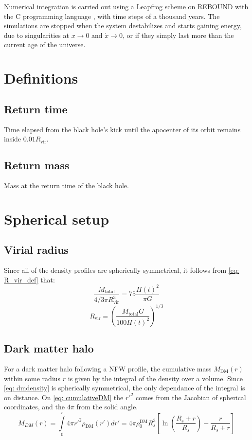 		Numerical integration is carried out using a Leapfrog scheme on REBOUND with the C programming language \cite{larson2017modeling}, with time steps of a thousand years. The simulations are stopped when the system destabilizes and starts gaining energy, due to singularities at $x \rightarrow 0$ and $\dot{x} \rightarrow 0$, or if they simply last more than the current age of the universe. 
		
	\section{Definitions}
		\subsection{Return time}
			Time elapsed from the black hole's kick until the apocenter of its orbit remains inside $0.01R_\text{vir}$.
		\subsection{Return mass}
			Mass at the return time of the black hole.
			
	\section{Spherical setup}
	\subsection{Virial radius}
		Since all of the density profiles are spherically symmetrical, it follows from \autoref{eq: R_vir_def} that:  
		\begin{equation}
		\dfrac{M_\text{total}}{4/3\pi R_\text{vir}^3} = 75\dfrac{H(t)^2}{\pi G}
		\end{equation}
		\begin{equation}\label{eq: r_vir}
		R_\text{vir} = \left({\dfrac{M_\text{total}G}{100 H(t)^2}}\right)^{1/3}
		\end{equation}
	
	\subsection{Dark matter halo}
		For a dark matter halo following a NFW profile, the cumulative mass $M_\text{DM}(r)$ within some radius $r$ is given by the integral of the density over a volume. Since \autoref{eq: dmdensity} is spherically symmetrical, the only dependance of the integral is on distance. On \autoref{eq: cumulativeDM} the $r'^2$ comes from the Jacobian of spherical coordinates, and the $4\pi$ from the solid angle.
		\begin{equation}\label{eq: cumulativeDM}
			M_{DM}(r) = \int\limits_0^{r} 4\pi {r'}^2\rho_\text{DM}(r')dr' = 4\pi\rho_0^\text{DM}R_s^3\left[\ln\left(\dfrac{R_s + r}{R_s}\right) - \dfrac{r}{R_s + r}\right]
		\end{equation}
		
